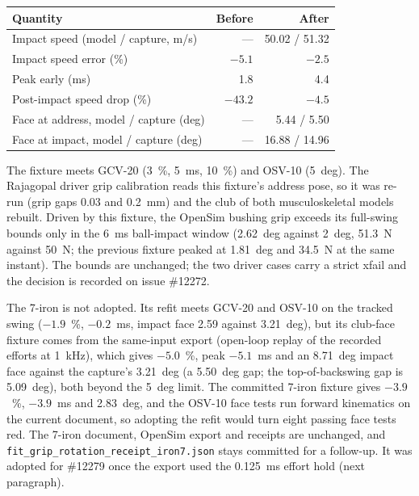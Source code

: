 \documentclass[11pt,a4paper]{article}
\begin{document}
\begin{center}
\begin{tabular}{lrr}
\hline
Quantity & Before & After \\
\hline
Impact speed (model / capture, m/s) & --- & 50.02 / 51.32 \\
Impact speed error (\%) & $-5.1$ & $-2.5$ \\
Peak early (ms) & 1.8 & 4.4 \\
Post-impact speed drop (\%) & $-43.2$ & $-4.5$ \\
Face at address, model / capture (deg) & --- & 5.44 / 5.50 \\
Face at impact, model / capture (deg) & --- & 16.88 / 14.96 \\
\hline
\end{tabular}
\end{center}
The fixture meets GCV-20 (3~\%, 5~ms, 10~\%) and OSV-10 (5~deg).
The Rajagopal driver grip calibration reads this fixture's address pose, so it was
re-run (grip gaps 0.03 and 0.2~mm) and the club of both musculoskeletal models
rebuilt. Driven by this fixture, the OpenSim bushing grip exceeds its full-swing
bounds only in the 6~ms ball-impact window (2.62~deg against 2~deg, 51.3~N
against 50~N; the previous fixture peaked at 1.81~deg and 34.5~N at the same
instant). The bounds are unchanged; the two driver cases carry a strict xfail
and the decision is recorded on issue \#12272.

The 7-iron is not adopted. Its refit meets GCV-20 and OSV-10 on the tracked swing
($-1.9$~\%, $-0.2$~ms, impact face 2.59 against 3.21~deg), but its club-face fixture
comes from the same-input export (open-loop replay of the recorded efforts at
1~kHz), which gives $-5.0$~\%, peak $-5.1$~ms and an 8.71~deg impact face against
the capture's 3.21~deg (a 5.50~deg gap; the top-of-backswing gap is 5.09~deg), both
beyond the 5~deg limit. The committed 7-iron fixture gives $-3.9$~\%, $-3.9$~ms and
2.83~deg, and the OSV-10 face tests run forward kinematics on the current document,
so adopting the refit would turn eight passing face tests red. The 7-iron document,
OpenSim export and receipts are unchanged, and
\texttt{fit\_grip\_rotation\_receipt\_iron7.json} stays committed for a follow-up.
It was adopted for \#12279 once the export used the 0.125~ms effort hold (next
paragraph).
\end{document}
